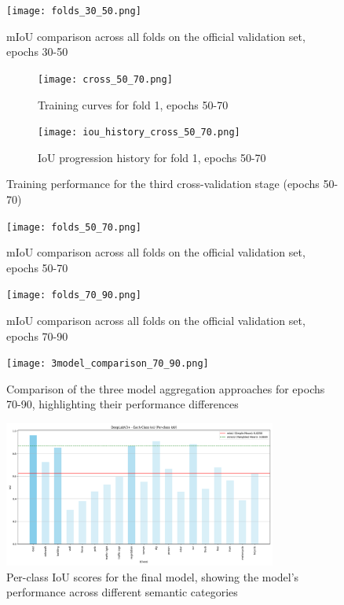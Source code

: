 \documentclass[]{article}
\begin{document}
\begin{figure}[htbp]
    \centering
    \texttt{[image: folds\_30\_50.png]}
    \caption{mIoU comparison across all folds on the official validation set, epochs 30-50}
    \label{fig:cross_val_30_50_val}
\end{figure}

\begin{figure}[htbp]
    \centering
    \begin{subfigure}[b]{0.8\textwidth}
        \centering
        \texttt{[image: cross\_50\_70.png]}
        \caption{Training curves for fold 1, epochs 50-70}
        \label{fig:cross_val_50_70}
    \end{subfigure}
    \vspace{0.5cm}
    \begin{subfigure}[b]{0.8\textwidth}
        \centering
        \texttt{[image: iou\_history\_cross\_50\_70.png]}
        \caption{IoU progression history for fold 1, epochs 50-70}
        \label{fig:cross_val_50_70_iou_his}
    \end{subfigure}
    \caption{Training performance for the third cross-validation stage (epochs 50-70)}
    \label{fig:cross_val_50_70_combined}
\end{figure}

\begin{figure}[htbp]
    \centering
    \texttt{[image: folds\_50\_70.png]}
    \caption{mIoU comparison across all folds on the official validation set, epochs 50-70}
    \label{fig:cross_val_50_70_val}
\end{figure}

\begin{figure}[htbp]
		\centering
		\texttt{[image: folds\_70\_90.png]}
		\caption{mIoU comparison across all folds on the official validation set, epochs 70-90}
		\label{fig:cross_val_70_90_val}
\end{figure}

\begin{figure}[htbp]
    \centering
    \texttt{[image: 3model\_comparison\_70\_90.png]}
    \caption{Comparison of the three model aggregation approaches for epochs 70-90, highlighting their performance differences}
    \label{fig:3model_comparison}
\end{figure}
\begin{figure}[htbp]
    \centering
    \includegraphics[width=0.8\textwidth]{outputs/deeplabv3plus_test_results/per_class_iou.png}
    \caption{Per-class IoU scores for the final model, showing the model's performance across different semantic categories}
    \label{fig:per_class_iou}
\end{figure}
\end{document}
